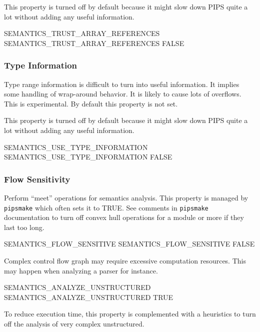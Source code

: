 \documentclass[a4paper]{report}
\newcommand{\Pipsmake}{\texttt{pipsmake}}
\begin{document}
This property is turned off by default because it might slow down PIPS
quite a lot without adding any useful information.

\begin{PipsProp}{SEMANTICS_TRUST_ARRAY_REFERENCES}
SEMANTICS_TRUST_ARRAY_REFERENCES FALSE
\end{PipsProp}

\subsubsection{Type Information}
\label{subsubsection:type-information}

Type range information is difficult to turn into useful
information. It implies some handling of wrap-around behavior. It is
likely to cause lots of overflows. This is experimental. By default
this property is not set.

This property is turned off by default because it might slow down PIPS
quite a lot without adding any useful information.

\begin{PipsProp}{SEMANTICS_USE_TYPE_INFORMATION}
SEMANTICS_USE_TYPE_INFORMATION FALSE
\end{PipsProp}

\subsubsection{Flow Sensitivity}

Perform ``meet'' operations for semantics analysis. This property is
managed by \Pipsmake{} which often sets it to TRUE. See comments in
\Pipsmake{}
documentation to turn off convex hull operations for a module or more if
they last too long.

\begin{PipsProp}{SEMANTICS_FLOW_SENSITIVE}
SEMANTICS_FLOW_SENSITIVE FALSE
\end{PipsProp}

Complex control flow graph may require excessive computation
resources. This may happen when analyzing a parser for instance.

\begin{PipsProp}{SEMANTICS_ANALYZE_UNSTRUCTURED}
SEMANTICS_ANALYZE_UNSTRUCTURED TRUE
\end{PipsProp}

To reduce execution time, this property is complemented with a heuristics
to turn off the analysis of very complex unstructured.
\end{document}
